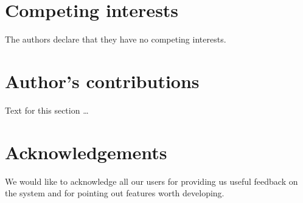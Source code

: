 \documentclass{bmcart}
\begin{document}
\begin{backmatter}

\section*{Competing interests}
  The authors declare that they have no competing interests.

\section*{Author's contributions}
    Text for this section \ldots

\section*{Acknowledgements}
We would like to acknowledge all our users for providing us useful feedback on
the system and for pointing out features worth developing.






\end{backmatter}
\end{document}
